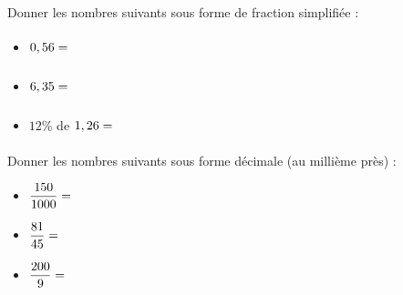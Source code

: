 \documentclass{automatisme}
\begin{document}
\begin{frame}
	Donner les nombres suivants sous forme de fraction simplifiée :

	\begin{itemize}
		\item $0,56 = \correction{\dfrac{56}{100} = \dfrac{14}{25}}$
		\item $6,35 = \correction{\dfrac{635}{100} = \dfrac{127}{20}}$
		\item $12$\% de $1,26 = \correction{0,1512 = \dfrac{1512}{10000} = \dfrac{189}{1250}}$
	\end{itemize}

	Donner les nombres suivants sous forme décimale (au millième près) :
	\begin{itemize}
		\item $\dfrac{150}{1000} = \correction{0,15}$
		\item $\dfrac{81}{45} = \correction{1,8}$
		\item $\dfrac{200}{9} = \correction{22,222}$
	\end{itemize}
\end{frame}
\end{document}
